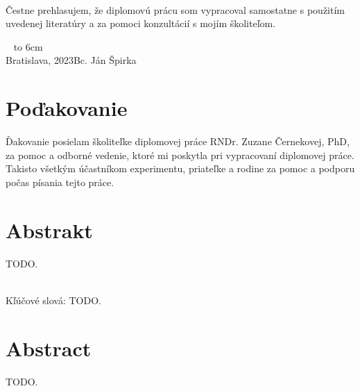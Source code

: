 \documentclass[12pt, a4paper, oneside]{book}
\newcommand\mfauthor{Bc. Ján Špirka}
\newcommand\mfplacedate{Bratislava, 2023}
\begin{document}
\noindent
\begin{minipage}{0.25\textwidth}~\end{minipage}
\begin{minipage}{0.75\textwidth}
Čestne prehlasujem, že diplomovú prácu som vypracoval samostatne s použitím uvedenej literatúry a za pomoci konzultácií s mojím školiteľom.
\newline \newline
\end{minipage}
\vfill
~ \hfill {\hbox to 6cm{\dotfill}} \\
\mfplacedate \hfill \mfauthor
\vfill\eject 



\chapter*{Poďakovanie}\label{chap:thank_you}
Ďakovanie posielam školiteľke diplomovej práce RNDr. Zuzane Černekovej, PhD, za pomoc a odborné vedenie, ktoré mi poskytla pri vypracovaní  diplomovej práce. Takisto všetkým účastníkom experimentu, priateľke a rodine za pomoc a podporu počas písania tejto práce.
\vfill\eject 





\chapter*{Abstrakt}\label{chap:abstract_sk}
TODO.

~\\
Kľúčové slová: TODO.
\vfill\eject 



\chapter*{Abstract}\label{chap:abstract_en}
TODO.
\end{document}
